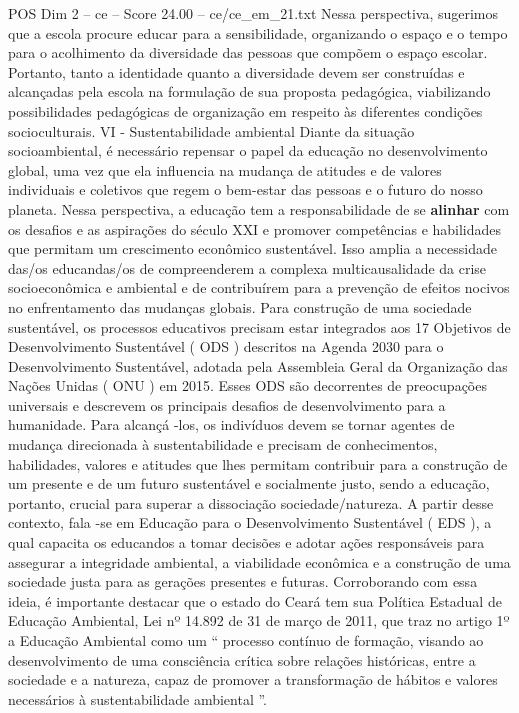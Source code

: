 \begin{textsample}{POS Dim 2 – ce – Score 24.00 – ce/ce\_em\_21.txt}
Nessa perspectiva, sugerimos que a escola procure educar para a sensibilidade, organizando o espaço e o tempo para o acolhimento da diversidade das pessoas que compõem o espaço escolar.
Portanto, tanto a identidade quanto a diversidade devem ser construídas e alcançadas pela escola na formulação de sua proposta pedagógica, viabilizando possibilidades pedagógicas de organização em respeito às diferentes condições socioculturais.
VI - Sustentabilidade ambiental Diante da situação socioambiental, é necessário repensar o papel da educação no desenvolvimento global, uma vez que ela influencia na mudança de atitudes e de valores individuais e coletivos que regem o bem-estar das pessoas e o futuro do nosso planeta.
Nessa perspectiva, a educação tem a responsabilidade de se \textbf{alinhar} com os desafios e as aspirações do século XXI e promover competências e habilidades que permitam um crescimento econômico sustentável.
Isso amplia a necessidade das/os educandas/os de compreenderem a complexa multicausalidade da crise socioeconômica e ambiental e de contribuírem para a prevenção de efeitos nocivos no enfrentamento das mudanças globais.
Para construção de uma sociedade sustentável, os processos educativos precisam estar integrados aos 17 Objetivos de Desenvolvimento Sustentável ( ODS ) descritos na Agenda 2030 para o Desenvolvimento Sustentável, adotada pela Assembleia Geral da Organização das Nações Unidas ( ONU ) em 2015.
Esses ODS são decorrentes de preocupações universais e descrevem os principais desafios de desenvolvimento para a humanidade.
Para alcançá -los, os indivíduos devem se tornar agentes de mudança direcionada à sustentabilidade e precisam de conhecimentos, habilidades, valores e atitudes que lhes permitam contribuir para a construção de um presente e de um futuro sustentável e socialmente justo, sendo a educação, portanto, crucial para superar a dissociação sociedade/natureza.
A partir desse contexto, fala -se em Educação para o Desenvolvimento Sustentável ( EDS ), a qual capacita os educandos a tomar decisões e adotar ações responsáveis para assegurar a integridade ambiental, a viabilidade econômica e a construção de uma sociedade justa para as gerações presentes e futuras.
Corroborando com essa ideia, é importante destacar que o estado do Ceará tem sua Política Estadual de Educação Ambiental, Lei nº 14.892 de 31 de março de 2011, que traz no artigo 1º a Educação Ambiental como um “ processo contínuo de formação, visando ao desenvolvimento de uma consciência crítica sobre relações históricas, entre a sociedade e a natureza, capaz de promover a transformação de hábitos e valores necessários à sustentabilidade ambiental ”.

\end{textsample}
